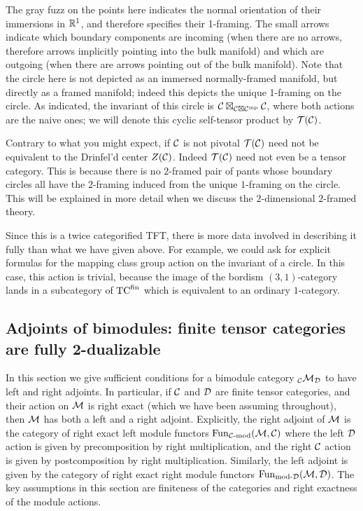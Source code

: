 \documentclass{amsart}
\begin{document}
\nid The gray fuzz on the points here indicates the normal orientation of their immersions in $\mathbb R^1$, and therefore specifies their 1-framing.  The small arrows indicate which boundary components are incoming (when there are no arrows, therefore arrows implicitly pointing into the bulk manifold) and which are outgoing (when there are arrows pointing out of the bulk manifold).  Note that the circle here is not depicted as an immersed normally-framed manifold, but directly as a framed manifold; indeed this depicts the unique 1-framing on the circle.  As indicated, the invariant of this circle is $\mathcal C \boxtimes_{\mathcal C \boxtimes \mathcal C^{\mathrm{mp}}} \mathcal C$, where both actions are the naive ones; we will denote this cyclic self-tensor product by $\mathcal T(\mathcal C)$.

\begin{warning}
Contrary to what you might expect,  if $\mathcal C$ is not pivotal $\mathcal T(\mathcal C)$ need not be equivalent to the Drinfel'd center $Z(\mathcal C)$.  Indeed $\mathcal T(\mathcal C)$ need not even be a tensor category.  This is because there is no $2$-framed pair of pants whose boundary circles all have the $2$-framing induced from the unique $1$-framing on the circle.  This will be explained in more detail when we discuss the $2$-dimensional $2$-framed theory.
\end{warning}

\begin{remark}
Since this is a twice categorified TFT, there is more data involved in describing it fully than what we have given above.  For example, we could ask for explicit formulas for the mapping class group action on the invariant of a circle.  In this case, this action is trivial,  because the image of the bordism $(3,1)$-category lands in a subcategory of ${\mathrm{TC}^{\text{fin}}}$ which is equivalent to an ordinary $1$-category.
\end{remark}  

\subsection{Adjoints of bimodules: finite tensor categories are fully 2-dualizable}  \label{sec-df-modules}

In this section we give sufficient conditions for a  bimodule category ${}_\mathcal C \mathcal M_\mathcal D$ to have left and right adjoints.  In particular, if $\mathcal C$ and $\mathcal D$ are finite tensor categories, and their action on $\mathcal M$ is right exact (which we have been assuming throughout), then $\mathcal M$ has both a left and a right adjoint.  Explicitly, the right adjoint of $\mathcal M$ is the category of right exact left module functors $\operatorname{Fun}_{{\mathcal C\text{-mod}}}(\mathcal M, \mathcal C)$ where the left $\mathcal D$ action is given by precomposition by right multiplication, and the right $\mathcal C$ action is given by postcomposition by right multiplication.  Similarly, the left adjoint is given by the category of right exact right module functors $\operatorname{Fun}_{\text{mod-}\mathcal D}(\mathcal M, \mathcal D)$.  The key assumptions in this section are finiteness of the categories and right exactness of the module actions.
\end{document}
